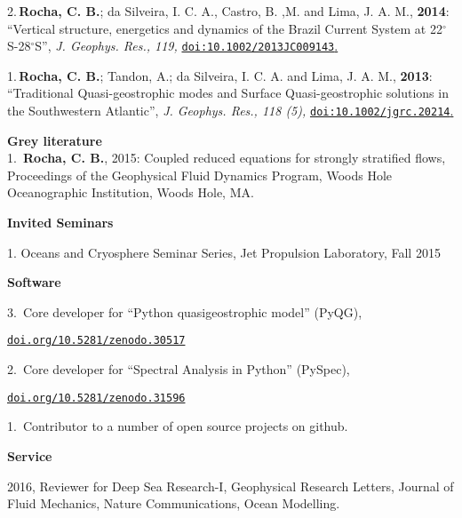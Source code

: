 \documentclass[a4paper,11pt,final]{memoir}
\newcommand{\Sep}{\vspace{1.25em}}
\newcommand{\SmallSep}{\vspace{0.5em}}
\newcommand{\CVSection}[1]
    {\Large\textbf{#1}\par
    \SmallSep\normalsize\normalfont}
\newcommand{\CVItem}[1]
    {\textbf{\color{NavyBlue} #1}}
\begin{document}
\SmallSep

2.\,\textbf{Rocha, C. B.};  da Silveira, I. C. A., Castro, B. ,M. and Lima, J. A. M., \textbf{2014}: ``Vertical structure, energetics and dynamics of the Brazil Current System at 22$^\circ$S-28$^\circ$S'', \textit{ J. Geophys. Res., 119,} \href{http://onlinelibrary.wiley.com/doi/10.1002/2013JC009143/abstract}{\texttt{doi:10.1002/2013JC009143}.} 

\SmallSep

1.\,\textbf{Rocha, C. B.}; Tandon, A.; da Silveira, I. C. A. and Lima, J. A. M., \textbf{2013}: ``Traditional Quasi-geostrophic modes and Surface Quasi-geostrophic solutions in the Southwestern Atlantic'', \textit{ J. Geophys. Res., 118 (5),} \href{http://dx.doi.org/10.1002/jgrc.20214}{\texttt{doi:10.1002/jgrc.20214}.} 

\SmallSep

\clearpage
\framebreak
\framebreak


\CVItem{Grey literature}\\

1.\, \textbf{Rocha, C. B.}, 2015: Coupled reduced equations for strongly stratified flows,  Proceedings of the Geophysical Fluid Dynamics Program,  Woods Hole Oceanographic Institution, Woods Hole, MA.

\Sep

\CVSection{Invited Seminars}

1. Oceans and Cryosphere Seminar Series, Jet Propulsion Laboratory, Fall 2015

\Sep

\CVSection{Software}

3.\, Core developer for ``Python quasigeostrophic model'' (PyQG),

\href{http://dx.doi.org/10.5281/zenodo.30517}{\texttt{doi.org/10.5281/zenodo.30517}} 

\SmallSep

2.\, Core developer for ``Spectral Analysis in Python'' (PySpec),

\href{http://dx.doi.org/10.5281/zenodo.31596}{\texttt{doi.org/10.5281/zenodo.31596}} 

1.\, Contributor to a number of open source projects on github.

\Sep


\CVSection{Service}


2016, Reviewer for Deep Sea Research-I, Geophysical Research Letters, Journal of 
        Fluid Mechanics, Nature Communications, Ocean Modelling. \\
\end{document}
